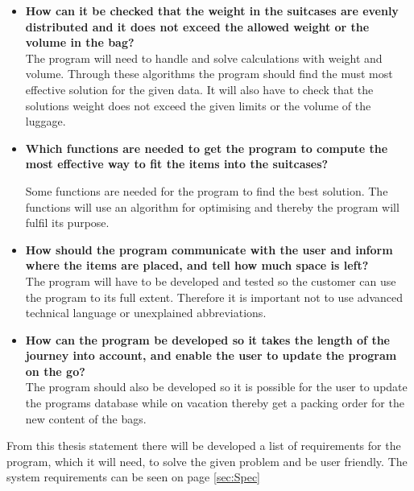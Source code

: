 \begin{itemize}
\item \textbf{How can it be checked that the weight in the suitcases are evenly distributed and it does not exceed the allowed weight or the volume in the bag?}\\

The program will need to handle and solve calculations with weight and volume. Through these algorithms the program should find the must most effective solution for the given data. It will also have to check that the solutions weight does not exceed the given limits or the volume of the luggage.

\item \textbf{Which functions are needed to get the program to compute the most effective way to fit the items into the suitcases?}\newline

Some functions are needed for the program to find the best solution. The functions will use an algorithm for optimising and thereby the program will fulfil its purpose.

\item \textbf{How should the program communicate with the user and inform where the items are placed, and tell how much space is left?}\\

The program will have to be developed and tested so the customer can use the program to its full extent. Therefore it is important not to use advanced technical language or unexplained abbreviations.

\item \textbf{How can the program be developed so it takes the length of the journey  into account, and enable the user to update the program on the go?}\\

The program should also be developed so it is possible for the user to update the programs database while on vacation thereby get a packing order for the new content of the bags.
\end{itemize}

From this thesis statement there will be developed a list of requirements for the program, which it will need, to solve the given problem and be user friendly. The system requirements can be seen on page \ref{sec:Spec}
